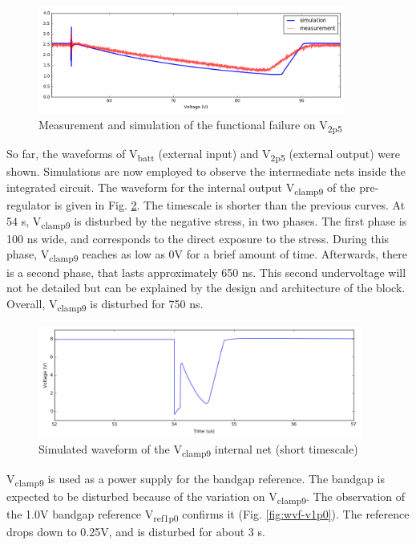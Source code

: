 \begin{figure}[!h]
  \centering
  \includegraphics[width=0.9\textwidth]{src/3/figures/v2p5.png}
  \caption{Measurement and simulation of the functional failure on V\textsubscript{2p5}}
  \label{fig:wvf-v2p5}
\end{figure}

So far, the waveforms of V\textsubscript{batt} (external input) and V\textsubscript{2p5} (external output) were shown.
Simulations are now employed to observe the intermediate nets inside the integrated circuit.
The waveform for the internal output V\textsubscript{clamp9} of the pre-regulator is given in Fig. \ref{fig:wvf-vclamp9}.
The timescale is shorter than the previous curves.
At 54 \textmugreek{}s,  V\textsubscript{clamp9} is disturbed by the negative stress, in two phases.
The first phase is 100 ns wide, and corresponds to the direct exposure to the stress.
During this phase, V\textsubscript{clamp9} reaches as low as 0V for a brief amount of time.
Afterwards, there is a second phase, that lasts approximately 650 ns.
This second undervoltage will not be detailed but can be explained by the design and architecture of the block.
Overall, V\textsubscript{clamp9} is disturbed for 750 ns.

\begin{figure}[!h]
  \centering
  \includegraphics[width=0.95\textwidth]{src/3/figures/vclamp9.png}
  \caption{Simulated waveform of the V\textsubscript{clamp9} internal net (short timescale)}
  \label{fig:wvf-vclamp9}
\end{figure}

V\textsubscript{clamp9} is used as a power supply for the bandgap reference.
The bandgap is expected to be disturbed because of the variation on V\textsubscript{clamp9}.
The observation of the 1.0V bandgap reference V\textsubscript{ref1p0} confirms it (Fig. \ref{fig:wvf-v1p0}).
The reference drops down to 0.25V, and is disturbed for about 3 \textmugreek{}s.

